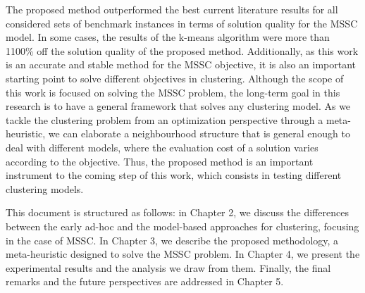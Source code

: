 The proposed method outperformed the best current literature results for all considered sets of benchmark
instances in terms of solution quality for the MSSC model. In some cases, the results of the k-means algorithm were more than 1100\% off the solution quality of the proposed method. Additionally, as this work is an accurate and stable method for the MSSC objective, it is also an important starting point to solve different objectives in clustering. Although the scope of this work is focused on solving the MSSC problem, the long-term goal in this research is to have a general framework that solves any clustering model. As we tackle the clustering problem from an optimization perspective through a meta-heuristic, we can elaborate a neighbourhood structure that is general enough to deal with different models, where the evaluation cost of a solution varies according to the objective. Thus, the proposed method is an important instrument to the coming step of this work, which consists in testing different clustering models.

This document is structured as follows: in Chapter 2, we discuss the differences between the early ad-hoc and the model-based approaches for clustering, focusing in the case of MSSC. In Chapter 3, we describe the proposed methodology, a meta-heuristic designed to solve the MSSC problem. In Chapter 4, we present the experimental results and the analysis we draw from them. Finally, the final remarks and the future perspectives are addressed in Chapter 5.